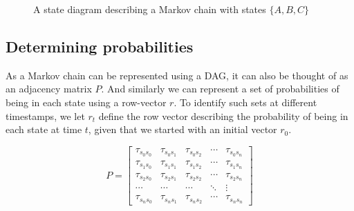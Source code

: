 \begin{figure}
\centering
{}
\caption{A state diagram describing a Markov chain with states $\{A, B, C\}$}
\label{markov:model:example1}
\end{figure}

\subsection{Determining probabilities}

As a Markov chain can be represented using a DAG, it can also be thought of as an adjacency matrix $P$.
And similarly we can represent a set of probabilities of being in each state using a row-vector $r$.
To identify such sets at different timestamps, we let $r_t$ define the row vector describing the probability of being in each state at time $t$, given that we started with an initial vector $r_0$.

\begin{equation}
P = \begin{bmatrix}
    \tau_{{s_0}{s_0}} & \tau_{{s_0}{s_1}} & \tau_{{s_0}{s_2}} & \cdots & \tau_{{s_0}{s_n}} \\[0.3em]
    \tau_{{s_1}{s_0}} & \tau_{{s_1}{s_1}} & \tau_{{s_1}{s_2}} & \cdots & \tau_{{s_1}{s_n}} \\[0.3em]
    \tau_{{s_2}{s_0}} & \tau_{{s_2}{s_1}} & \tau_{{s_2}{s_2}} & \cdots & \tau_{{s_2}{s_n}} \\[0.3em]
          \cdots      &      \cdots       &      \cdots       & \ddots &     \vdots \\[0.3em]
   \tau_{{s_n}{s_0}} & \tau_{{s_n}{s_1}} & \tau_{{s_n}{s_2}} & \cdots & \tau_{{s_n}{s_n}}
     \end{bmatrix}
\end{equation}

